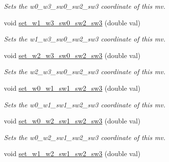 \begin{DoxyCompactItemize}
\begin{DoxyCompactList}\small\item\em Sets the w0\-\_\-w3\-\_\-sw0\-\_\-sw2\-\_\-sw3 coordinate of this mv. \end{DoxyCompactList}\item 
\hypertarget{classe3ga_1_1mv_a033b0714bbf91f93ae0f3a837544a18e}{void \hyperlink{classe3ga_1_1mv_a033b0714bbf91f93ae0f3a837544a18e}{set\-\_\-w1\-\_\-w3\-\_\-sw0\-\_\-sw2\-\_\-sw3} (double val)}\label{classe3ga_1_1mv_a033b0714bbf91f93ae0f3a837544a18e}

\begin{DoxyCompactList}\small\item\em Sets the w1\-\_\-w3\-\_\-sw0\-\_\-sw2\-\_\-sw3 coordinate of this mv. \end{DoxyCompactList}\item 
\hypertarget{classe3ga_1_1mv_a2778c87a67172ed2b765c6d66ceabd41}{void \hyperlink{classe3ga_1_1mv_a2778c87a67172ed2b765c6d66ceabd41}{set\-\_\-w2\-\_\-w3\-\_\-sw0\-\_\-sw2\-\_\-sw3} (double val)}\label{classe3ga_1_1mv_a2778c87a67172ed2b765c6d66ceabd41}

\begin{DoxyCompactList}\small\item\em Sets the w2\-\_\-w3\-\_\-sw0\-\_\-sw2\-\_\-sw3 coordinate of this mv. \end{DoxyCompactList}\item 
\hypertarget{classe3ga_1_1mv_abaf81163dbfdfd179e8cd93dab0d2e1c}{void \hyperlink{classe3ga_1_1mv_abaf81163dbfdfd179e8cd93dab0d2e1c}{set\-\_\-w0\-\_\-w1\-\_\-sw1\-\_\-sw2\-\_\-sw3} (double val)}\label{classe3ga_1_1mv_abaf81163dbfdfd179e8cd93dab0d2e1c}

\begin{DoxyCompactList}\small\item\em Sets the w0\-\_\-w1\-\_\-sw1\-\_\-sw2\-\_\-sw3 coordinate of this mv. \end{DoxyCompactList}\item 
\hypertarget{classe3ga_1_1mv_af49c5aac38ccdc0530b270ff743c8b1c}{void \hyperlink{classe3ga_1_1mv_af49c5aac38ccdc0530b270ff743c8b1c}{set\-\_\-w0\-\_\-w2\-\_\-sw1\-\_\-sw2\-\_\-sw3} (double val)}\label{classe3ga_1_1mv_af49c5aac38ccdc0530b270ff743c8b1c}

\begin{DoxyCompactList}\small\item\em Sets the w0\-\_\-w2\-\_\-sw1\-\_\-sw2\-\_\-sw3 coordinate of this mv. \end{DoxyCompactList}\item 
\hypertarget{classe3ga_1_1mv_a88a2661e30f8a45bc33bd90c263055a1}{void \hyperlink{classe3ga_1_1mv_a88a2661e30f8a45bc33bd90c263055a1}{set\-\_\-w1\-\_\-w2\-\_\-sw1\-\_\-sw2\-\_\-sw3} (double val)}\label{classe3ga_1_1mv_a88a2661e30f8a45bc33bd90c263055a1}


\end{DoxyCompactItemize}
